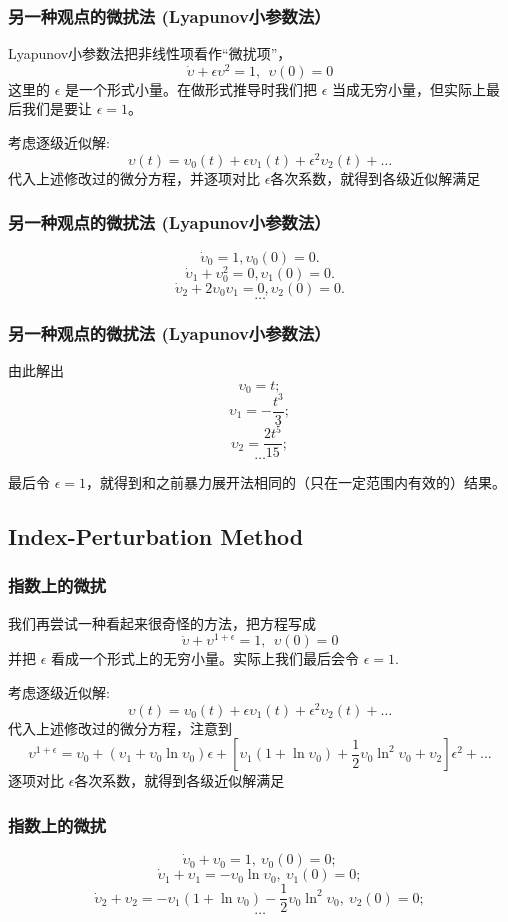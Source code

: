 \documentclass[CJK]{beamer}
\begin{document}
\begin{frame}
  \frametitle{另一种观点的微扰法 (Lyapunov小参数法）}
  Lyapunov小参数法把非线性项看作“微扰项”，
  $$ \dot\upsilon + \epsilon \upsilon^2 = 1,\ \  \upsilon(0)=0$$
  这里的 $\epsilon$ 是一个形式小量。在做形式推导时我们把 $\epsilon$ 当成无穷小量，但实际上最后我们是要让 $\epsilon = 1$。
  
  考虑逐级近似解:
  $$\upsilon(t) = \upsilon_0(t) + \epsilon \upsilon_1(t) + \epsilon^2 \upsilon_2(t)+\ldots$$
  代入上述修改过的微分方程，并逐项对比 $\epsilon$各次系数，就得到各级近似解满足
\end{frame}

\begin{frame}
  \frametitle{另一种观点的微扰法 (Lyapunov小参数法）}
    $$\dot \upsilon_0  = 1, \upsilon_0(0) = 0.$$
    $$\dot \upsilon_1+\upsilon_0^2  = 0, \upsilon_1(0) = 0.$$
    $$\dot \upsilon_2+ 2\upsilon_0\upsilon_1  = 0, \upsilon_2(0) = 0.$$        
    $$\ldots$$
\end{frame}

\begin{frame}
  \frametitle{另一种观点的微扰法 (Lyapunov小参数法）}
    由此解出
    $$\upsilon_0 = t; $$
    $$\upsilon_1 = -\frac{t^3}{3};$$
    $$\upsilon_2 = \frac{2t^5}{15};$$    
    $$ \ldots$$

   最后令 $\epsilon = 1$，就得到和之前暴力展开法相同的（只在一定范围内有效的）结果。
\end{frame}


\subsection{Index-Perturbation Method}

\begin{frame}
  \frametitle{指数上的微扰}
  我们再尝试一种看起来很奇怪的方法，把方程写成
  $$ \dot \upsilon + \upsilon^{1+\epsilon} = 1,\ \ \upsilon(0)=0$$
  并把 $\epsilon$ 看成一个形式上的无穷小量。实际上我们最后会令 $\epsilon = 1$.

  考虑逐级近似解:
  $$\upsilon(t) = \upsilon_0(t) + \epsilon \upsilon_1(t) + \epsilon^2 \upsilon_2(t)+\ldots$$
  代入上述修改过的微分方程，注意到
 $$ \upsilon^{1+\epsilon} = \upsilon_0+(\upsilon_1+\upsilon_0\ln\upsilon_0)\epsilon + \left[\upsilon_1(1+\ln\upsilon_0)+\frac{1}{2}\upsilon_0\ln^2\upsilon_0+\upsilon_2\right]\epsilon^2+\ldots $$
  逐项对比 $\epsilon$各次系数，就得到各级近似解满足
\end{frame}


\begin{frame}
  \frametitle{指数上的微扰}
  $$ \dot\upsilon_0+\upsilon_0 =1, \ \upsilon_0(0)= 0;$$
  $$ \dot\upsilon_1+\upsilon_1 =-\upsilon_0\ln\upsilon_0, \ \upsilon_1(0)= 0;$$
  $$ \dot\upsilon_2+\upsilon_2 =-\upsilon_1(1+\ln\upsilon_0)-\frac{1}{2}\upsilon_0\ln^2\upsilon_0, \ \upsilon_2(0)= 0;$$    
  $$\ldots $$
\end{frame}
\end{document}
